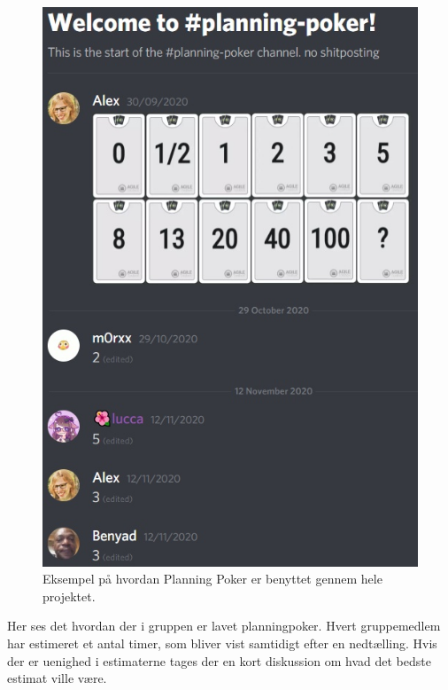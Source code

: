 \begin{figure}
    \includegraphics[width=\linewidth,scale=0.5]{figures/planningpoker.jpg}
    \caption{Eksempel på hvordan Planning Poker er benyttet gennem hele projektet.}
    \label{fig:Poker}
\end{figure}
Her ses det hvordan der i gruppen er lavet planningpoker. Hvert gruppemedlem har estimeret et antal timer, som bliver vist samtidigt efter en nedtælling. Hvis der er uenighed i estimaterne tages der en kort diskussion om hvad det bedste estimat ville være.